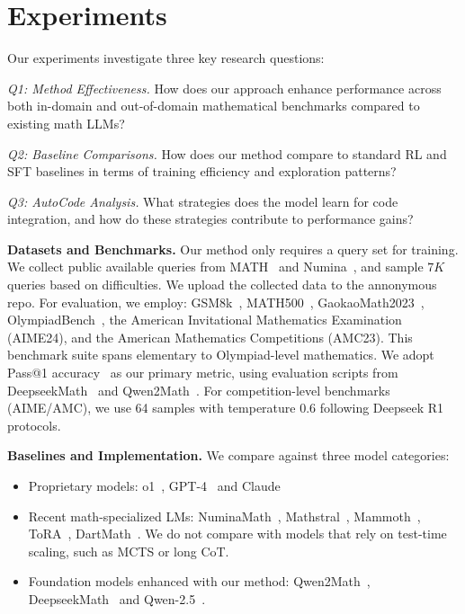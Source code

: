 
\section{Experiments}\label{sec_exp}
\vspace{-0.2cm}
Our experiments investigate three key research questions:

\noindent\emph{Q1: Method Effectiveness.} How does our approach enhance performance across both in-domain and out-of-domain mathematical benchmarks compared to existing math LLMs?

\noindent\emph{Q2: Baseline Comparisons.} How does our method compare to standard RL and SFT baselines in terms of training efficiency and exploration patterns?

\noindent\emph{Q3: AutoCode Analysis.} What strategies does the model learn for code integration, and how do these strategies contribute to performance gains?

\noindent\textbf{Datasets and Benchmarks.} Our method only requires a query set for training. We collect public available queries from MATH~\citep{math} and Numina~\cite{numina}, and sample \(7K\) queries based on difficulties. We upload the collected data to the annonymous repo. For evaluation, we employ: GSM8k~\citep{gsm8k}, MATH500~\citep{math}, GaokaoMath2023~\citep{mario}, OlympiadBench~\citep{olympiad}, the American Invitational Mathematics Examination (AIME24), and the American
Mathematics Competitions (AMC23). This benchmark suite spans elementary to Olympiad-level mathematics. We adopt Pass@1 accuracy~\citep{pass1, dsr1} as our primary metric, using evaluation scripts from DeepseekMath~\citep{dsmath} and Qwen2Math~\citep{yang2024qwen2}. For competition-level benchmarks (AIME/AMC), we use 64 samples with temperature 0.6 following Deepseek R1 protocols.


\noindent\textbf{Baselines and Implementation.} 
We compare against three model categories: \begin{itemize}[leftmargin=0.5cm,itemsep=0pt,parsep=0pt]
\item Proprietary models: o1~\cite{o1}, GPT-4~\citep{gpt4} and Claude~\citep{claude}
\item Recent math-specialized LMs: NuminaMath~\citep{numina}, Mathstral~\citep{mathstral}, Mammoth~\citep{mammoth}, ToRA~\citep{tora}, DartMath~\cite{tong2024dartmath}. We do not compare with models that rely on test-time scaling, such as MCTS or long CoT. 
\item Foundation models enhanced with our method: Qwen2Math~\citep{yang2024qwen2}, DeepseekMath~\citep{dsmath} and Qwen-2.5~\cite{qwen25}.
\end{itemize}

